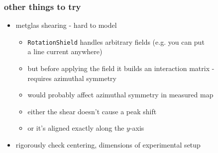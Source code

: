 \documentclass{beamer}
\begin{document}
\begin{frame}
\frametitle{other things to try}

    \begin{itemize}
    \item metglas shearing - hard to model
        \begin{itemize}
        \item \texttt{RotationShield} handles arbitrary fields (e.g. you can put \\ a line
        current anywhere)
        \item but before applying the field it builds an interaction matrix - \\ requires
        azimuthal symmetry
        \item would probably affect azimuthal symmetry in measured map \pause
        \item either the shear doesn't cause a peak shift \pause
        \item or it's aligned exactly along the $y$-axis \pause
        \end{itemize}
    \item rigorously check centering, dimensions of experimental setup
    \end{itemize}

\end{frame}
\end{document}
